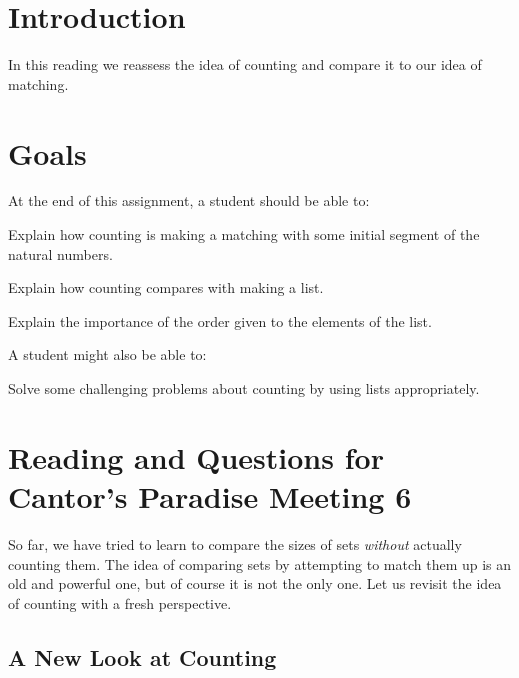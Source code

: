 \documentclass[12pt,letterpaper]{article}
\theoremstyle{definition}
\begin{document}
\setlength{\parskip}{1ex plus 0.5ex minus 0.2ex}
\setlength{\parindent}{0pt}

\pagestyle{fancy}
\cfoot{}

\section*{Introduction}
In this reading we reassess the idea of counting and compare it to our idea of matching.

\section*{Goals}
At the end of this assignment, a student should be able to:
\begin{compactitem}
\item Explain how counting is making a matching with some initial segment of the natural numbers.
\item Explain how counting compares with making a list.
\item Explain the importance of the order given to the elements of the list.
\end{compactitem}
A student might also be able to:
\begin{compactitem}
\item Solve some challenging problems about counting by using lists appropriately.
\end{compactitem}

\section*{Reading and Questions for Cantor's Paradise Meeting 6}

So far, we have tried to learn to compare the sizes of sets \emph{without} actually counting them.
The idea of comparing sets by attempting to match them up is an old and powerful one, but of course it is not the only one.
Let us revisit the idea of counting with a fresh perspective.

\subsection*{A New Look at Counting}
\end{document}
